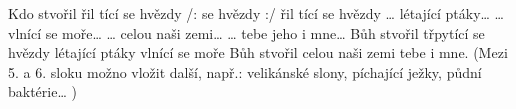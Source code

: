\begin{TEXT}{Kdo stvořil}
\SLOKA {} řil tící se hvězdy \NL
/:  se hvězdy :/ \NL
{} řil tící se hvězdy \NL
{}  
\SLOKA … létající ptáky…
\SLOKA … vlnící se moře… 
\SLOKA … celou naši zemi… 
\SLOKA … tebe jeho i mne… 
\SLOKA Bůh stvořil třpytící se hvězdy \NL
létající ptáky vlnící se moře \NL
Bůh stvořil celou naši zemi tebe i mne. 
\SLOKA[] (Mezi 5. a 6. sloku          možno vložit další, např.: \NL
velikánské slony, píchající ježky, půdní baktérie… )
\end{TEXT}
